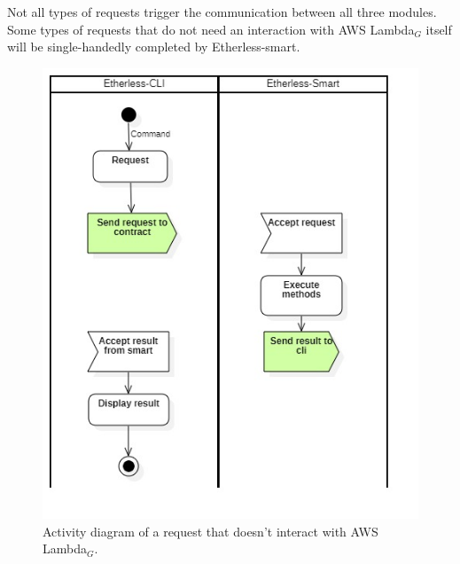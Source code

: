 	Not all types of requests trigger the communication between all three modules. Some types of requests that do not need an interaction with AWS Lambda$_{G}$ itself will be single-handedly completed by Etherless-smart.
	\begin{figure} [h!]
		\centering
		\includegraphics[width=0.8\linewidth]{diagrammi/generali/activity_diag_pattern1}
		\caption{Activity diagram of a request that doesn't interact with AWS Lambda$_{G}$.}
	\end{figure}
	\pagebreak
	\\
